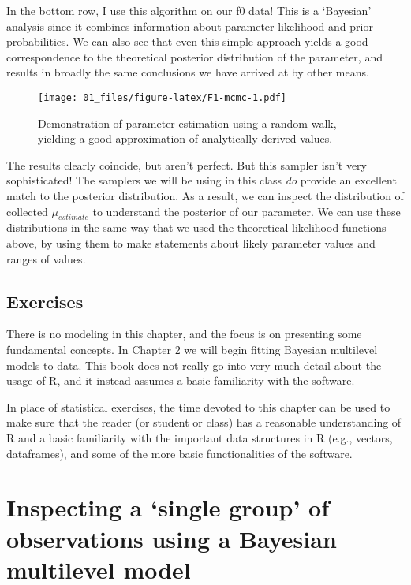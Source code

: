 \documentclass[
]{book}
\begin{document}
In the bottom row, I use this algorithm on our f0 data! This is a `Bayesian' analysis since it combines information about parameter likelihood and prior probabilities. We can also see that even this simple approach yields a good correspondence to the theoretical posterior distribution of the parameter, and results in broadly the same conclusions we have arrived at by other means.

\begin{figure}
\centering
\texttt{[image: 01\_files/figure-latex/F1-mcmc-1.pdf]}
\caption{\label{fig:F1-mcmc}Demonstration of parameter estimation using a random walk, yielding a good approximation of analytically-derived values.}
\end{figure}

The results clearly coincide, but aren't perfect. But this sampler isn't very sophisticated! The samplers we will be using in this class \emph{do} provide an excellent match to the posterior distribution. As a result, we can inspect the distribution of collected \(\mu_{estimate}\) to understand the posterior of our parameter. We can use these distributions in the same way that we used the theoretical likelihood functions above, by using them to make statements about likely parameter values and ranges of values.

\hypertarget{exercises}{%
\section{Exercises}\label{exercises}}

There is no modeling in this chapter, and the focus is on presenting some fundamental concepts. In Chapter 2 we will begin fitting Bayesian multilevel models to data. This book does not really go into very much detail about the usage of R, and it instead assumes a basic familiarity with the software.

In place of statistical exercises, the time devoted to this chapter can be used to make sure that the reader (or student or class) has a reasonable understanding of R and a basic familiarity with the important data structures in R (e.g., vectors, dataframes), and some of the more basic functionalities of the software.

\hypertarget{inspecting-a-single-group-of-observations-using-a-bayesian-multilevel-model}{%
\chapter{Inspecting a `single group' of observations using a Bayesian multilevel model}\label{inspecting-a-single-group-of-observations-using-a-bayesian-multilevel-model}}
\end{document}
